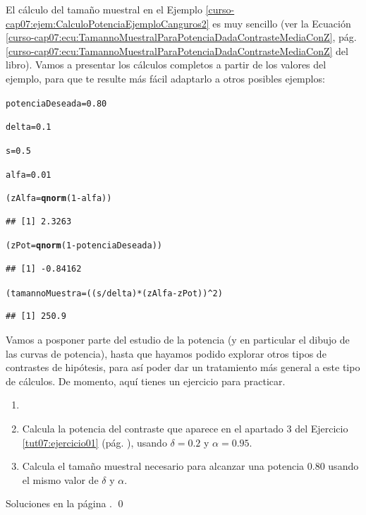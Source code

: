 \documentclass[10pt,a4paper]{article}\usepackage[]{graphicx}\usepackage[]{color}
\makeatletter
\newcommand{\hlnum}[1]{\textcolor[rgb]{0.686,0.059,0.569}{#1}}%
\newcommand{\hlopt}[1]{\textcolor[rgb]{0,0,0}{#1}}%
\newcommand{\hlstd}[1]{\textcolor[rgb]{0.345,0.345,0.345}{#1}}%
\newcommand{\hlkwb}[1]{\textcolor[rgb]{0.69,0.353,0.396}{#1}}%
\newcommand{\hlkwd}[1]{\textcolor[rgb]{0.737,0.353,0.396}{\textbf{#1}}}%
\newenvironment{kframe}{%
 \def\at@end@of@kframe{}%
 \ifinner\ifhmode%
  \def\at@end@of@kframe{\end{minipage}}%
  \begin{minipage}{\columnwidth}%
 \fi\fi%
 \def\FrameCommand##1{\hskip\@totalleftmargin \hskip-\fboxsep
 \colorbox{shadecolor}{##1}\hskip-\fboxsep
     \hskip-\linewidth \hskip-\@totalleftmargin \hskip\columnwidth}%
 \MakeFramed {\advance\hsize-\width
   \@totalleftmargin\z@ \linewidth\hsize
   \@setminipage}}%
 {\par\unskip\endMakeFramed%
 \at@end@of@kframe}
\newenvironment{knitrout}{}{} %
\newcounter {cont01}
\makeatother
\begin{document}
El cálculo del tamaño muestral en el Ejemplo \ref{curso-cap07:ejem:CalculoPotenciaEjemploCanguros2} es muy sencillo (ver la Ecuación \ref{curso-cap07:ecu:TamannoMuestralParaPotenciaDadaContrasteMediaConZ}, pág. \ref{curso-cap07:ecu:TamannoMuestralParaPotenciaDadaContrasteMediaConZ} del libro). Vamos a presentar los cálculos completos a partir de los valores del ejemplo, para que te resulte más fácil adaptarlo a otros posibles ejemplos:

\begin{knitrout}
\color{fgcolor}\begin{kframe}
\begin{alltt}
\hlstd{potenciaDeseada} \hlkwb{=} \hlnum{0.80}

\hlstd{delta} \hlkwb{=} \hlnum{0.1}

\hlstd{s} \hlkwb{=} \hlnum{0.5}

\hlstd{alfa} \hlkwb{=} \hlnum{0.01}

\hlstd{(zAlfa} \hlkwb{=} \hlkwd{qnorm}\hlstd{(}\hlnum{1}\hlopt{-} \hlstd{alfa))}
\end{alltt}
\begin{verbatim}
## [1] 2.3263
\end{verbatim}
\begin{alltt}
\hlstd{(zPot} \hlkwb{=} \hlkwd{qnorm}\hlstd{(}\hlnum{1} \hlopt{-} \hlstd{potenciaDeseada))}
\end{alltt}
\begin{verbatim}
## [1] -0.84162
\end{verbatim}
\begin{alltt}
\hlstd{(tamannoMuestra} \hlkwb{=}  \hlstd{( (s} \hlopt{/} \hlstd{delta)} \hlopt{*} \hlstd{(zAlfa} \hlopt{-} \hlstd{zPot))}\hlopt{^}\hlnum{2}\hlstd{)}
\end{alltt}
\begin{verbatim}
## [1] 250.9
\end{verbatim}
\end{kframe}
\end{knitrout}

Vamos a posponer parte del estudio de la potencia (y en particular el dibujo de las curvas de potencia), hasta que hayamos podido explorar otros tipos de contrastes de hipótesis, para así poder dar un tratamiento más general a este tipo de cálculos. De momento, aquí tienes un ejercicio para practicar.

\begin{ejercicio}
\label{tut07:ejercicio03}
\begin{enumerate}
  \item[]
  \item Calcula la potencia del contraste que aparece en el apartado 3 del Ejercicio \ref{tut07:ejercicio01} (pág. \pageref{tut07:ejercicio01}), usando $\delta = 0.2$ y $\alpha=0.95$.

  \item Calcula el tamaño muestral necesario para alcanzar una potencia  $0.80$ usando el mismo valor de $\delta$ y $\alpha$.
\end{enumerate}
Soluciones en la página \pageref{tut07:ejercicio03:sol}.
\qed
\end{ejercicio}
\end{document}
